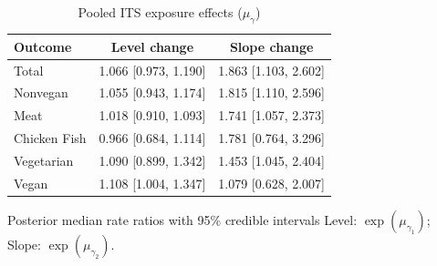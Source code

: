 \begin{table}[H]
\centering
\caption{Pooled ITS exposure effects ($\mu_\gamma$)}
\label{tab:a3_mu_gamma}
\begin{tabular}{lcc}
\toprule
Outcome & Level change & Slope change \\
\midrule
Total & 1.066 [0.973, 1.190] & 1.863 [1.103, 2.602] \\
Nonvegan & 1.055 [0.943, 1.174] & 1.815 [1.110, 2.596] \\
Meat & 1.018 [0.910, 1.093] & 1.741 [1.057, 2.373] \\
Chicken Fish & 0.966 [0.684, 1.114] & 1.781 [0.764, 3.296] \\
Vegetarian & 1.090 [0.899, 1.342] & 1.453 [1.045, 2.404] \\
Vegan & 1.108 [1.004, 1.347] & 1.079 [0.628, 2.007] \\
\bottomrule
\end{tabular}
\par\smallskip\footnotesize Posterior median rate ratios with 95\% credible intervals Level: $\exp(\mu_{\gamma_1})$; Slope: $\exp(\mu_{\gamma_2})$.
\end{table}
